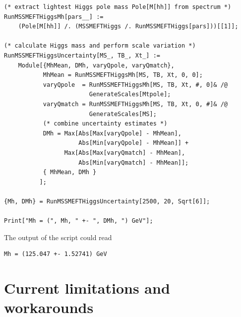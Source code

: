 \documentclass[final,3p,11pt,pdflatex]{elsarticle}
\begin{document}
\begin{example}[label=ex:MSSMEFTHiggs_uncertainty_estimate]
\begin{lstlisting}
(* extract lightest Higgs pole mass Pole[M[hh]] from spectrum *)
RunMSSMEFTHiggsMh[pars__] :=
    (Pole[M[hh]] /. (MSSMEFTHiggs /. RunMSSMEFTHiggs[pars]))[[1]];

(* calculate Higgs mass and perform scale variation *)
RunMSSMEFTHiggsUncertainty[MS_, TB_, Xt_] :=
    Module[{MhMean, DMh, varyQpole, varyQmatch},
           MhMean = RunMSSMEFTHiggsMh[MS, TB, Xt, 0, 0];
           varyQpole  = RunMSSMEFTHiggsMh[MS, TB, Xt, #, 0]& /@
                        GenerateScales[Mtpole];
           varyQmatch = RunMSSMEFTHiggsMh[MS, TB, Xt, 0, #]& /@
                        GenerateScales[MS];
           (* combine uncertainty estimates *)
           DMh = Max[Abs[Max[varyQpole] - MhMean],
                     Abs[Min[varyQpole] - MhMean]] +
                 Max[Abs[Max[varyQmatch] - MhMean],
                     Abs[Min[varyQmatch] - MhMean]];
           { MhMean, DMh }
          ];

{Mh, DMh} = RunMSSMEFTHiggsUncertainty[2500, 20, Sqrt[6]];

Print["Mh = (", Mh, " +- ", DMh, ") GeV"];
  \end{lstlisting}
  The output of the script could read
  \begin{lstlisting}
Mh = (125.047 +- 1.52741) GeV
  \end{lstlisting}
\end{example}

\section{Current limitations and workarounds}
\label{sec:limitations}
\end{document}
